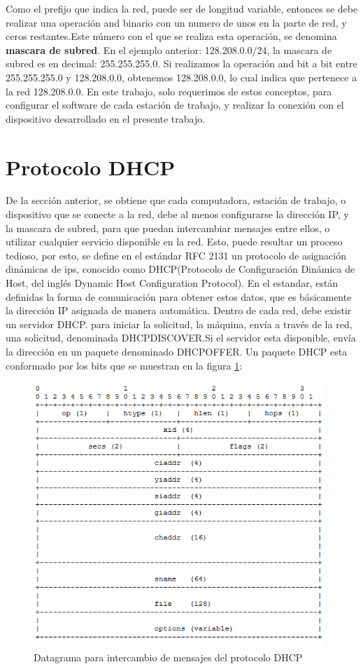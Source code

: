 Como el prefijo que indica la red, puede ser de longitud variable, entonces se debe realizar una operación and binario con un numero de unos en la parte de red, y ceros restantes.Este número con el que se realiza esta operación, se denomina \textbf{mascara de subred}. En el ejemplo anterior: 128.208.0.0/24, la mascara de subred es en decimal: 255.255.255.0. Si realizamos la operación and bit a bit entre 255.255.255.0 y 128.208.0.0, obtenemos 128.208.0.0, lo cual indica que pertenece a la red 128.208.0.0. En este trabajo, solo requerimos de estos conceptos, para configurar el software de cada estación de trabajo, y realizar la conexión con el dispositivo desarrollado en el presente trabajo.     
 
\section{Protocolo DHCP} 

De la sección anterior, se obtiene que cada computadora, estación de trabajo, o dispositivo que se conecte a la red, debe al menos configurarse la dirección IP, y la mascara de subred, para que puedan intercambiar mensajes entre ellos, o utilizar cualquier servicio disponible en la red. Esto, puede resultar un proceso tedioso, por esto, se define en el estándar RFC 2131 un protocolo de asignación dinámicas de ips, conocido como DHCP(Protocolo de Configuración Dinámica de Host,
del inglés Dynamic Host Configuration Protocol). En el estandar, están definidas la forma de comunicación para obtener estos datos, que es básicamente la dirección IP asignada de manera automática.  
Dentro de cada red, debe existir un servidor DHCP. para iniciar la solicitud, la máquina, envía a través de la red, una solicitud, denominada DHCPDISCOVER.Si el servidor esta disponible, envía la dirección en un paquete denominado DHCPOFFER. 
Un paquete DHCP esta conformado por los bits que se muestran en la figura \ref{fig:pqdhcp}: 
\begin{figure}[ht]
	\includegraphics[width=\textwidth,height=10cm]{paqdhcp}
	\caption{Datagrama para intercambio de mensajes del protocolo DHCP}
	\label{fig:pqdhcp}
\end{figure} 

